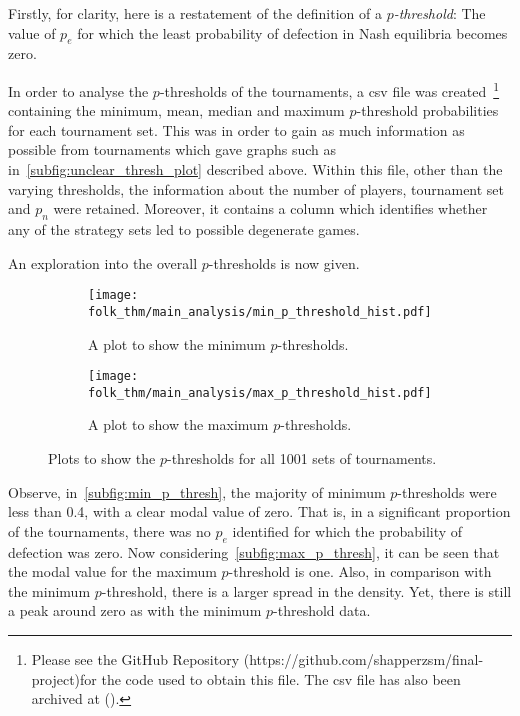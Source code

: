 Firstly, for clarity, here is a restatement of the definition of a
\textit{\(p\)-threshold}: The value of \(p_{e}\) for which the
least probability of defection in Nash equilibria becomes zero.

In order to analyse the \(p\)-thresholds of the tournaments, a csv file was
created~\footnote{Please see the GitHub Repository
(https://github.com/shapperzsm/final-project)for the code used to obtain this
file. The csv file has also been archived at ().}
containing the
minimum, mean, median and maximum \(p\)-threshold probabilities for each
tournament set.
This was in order to gain as much information as possible from tournaments which
gave graphs such as in~\autoref{subfig:unclear_thresh_plot} described above. 
Within this file, other than the varying thresholds, the
information about the number of players, tournament set and \(p_{n}\) were
retained. Moreover, it contains a column which identifies whether any
of the strategy sets led to possible degenerate games.

An exploration into the overall \(p\)-thresholds is now given.

\begin{figure}
    \begin{subfigure}{0.45\textwidth}
        \centering
        \texttt{[image: folk\_thm/main\_analysis/min\_p\_threshold\_hist.pdf]}
        \caption{A plot to show the minimum \(p\)-thresholds.}\label{subfig:min_p_thresh}
    \end{subfigure}
    \begin{subfigure}{0.45\textwidth}
        \centering
        \texttt{[image: folk\_thm/main\_analysis/max\_p\_threshold\_hist.pdf]}
        \caption{A plot to show the maximum \(p\)-thresholds.}\label{subfig:max_p_thresh}
    \end{subfigure}
    \caption{Plots to show the \(p\)-thresholds for all 1001 sets of tournaments.}\label{fig:min_max_p_thresh}
\end{figure}

Observe, in~\autoref{subfig:min_p_thresh}, the majority of minimum \(p\)-thresholds
were less than 0.4, with a clear modal value of zero. That is, in a significant
proportion of the tournaments, there was no \(p_{e}\)
identified for
which the probability of defection was zero. Now considering~\autoref{subfig:max_p_thresh}, it can be seen that the modal value for the
maximum \(p\)-threshold is one.
Also, in comparison with the minimum \(p\)-threshold, there is a larger spread in the
density. Yet, there is still a peak around zero as with the minimum \(p\)-threshold
data. 

